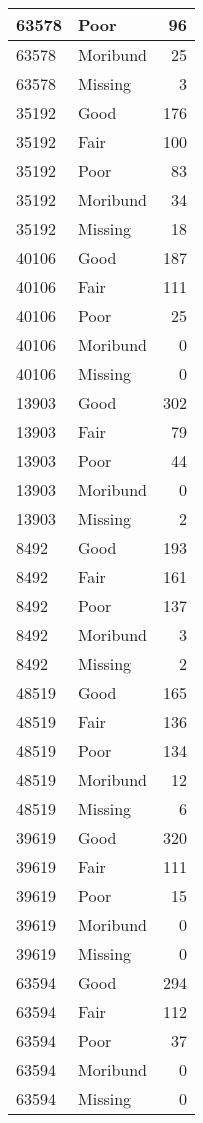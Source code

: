\documentclass[
]{article}
\begin{document}
\begin{tabular}{l|l|r}
\hline
63578 & Poor & 96\\
\hline
63578 & Moribund & 25\\
\hline
63578 & Missing & 3\\
\hline
35192 & Good & 176\\
\hline
35192 & Fair & 100\\
\hline
35192 & Poor & 83\\
\hline
35192 & Moribund & 34\\
\hline
35192 & Missing & 18\\
\hline
40106 & Good & 187\\
\hline
40106 & Fair & 111\\
\hline
40106 & Poor & 25\\
\hline
40106 & Moribund & 0\\
\hline
40106 & Missing & 0\\
\hline
13903 & Good & 302\\
\hline
13903 & Fair & 79\\
\hline
13903 & Poor & 44\\
\hline
13903 & Moribund & 0\\
\hline
13903 & Missing & 2\\
\hline
8492 & Good & 193\\
\hline
8492 & Fair & 161\\
\hline
8492 & Poor & 137\\
\hline
8492 & Moribund & 3\\
\hline
8492 & Missing & 2\\
\hline
48519 & Good & 165\\
\hline
48519 & Fair & 136\\
\hline
48519 & Poor & 134\\
\hline
48519 & Moribund & 12\\
\hline
48519 & Missing & 6\\
\hline
39619 & Good & 320\\
\hline
39619 & Fair & 111\\
\hline
39619 & Poor & 15\\
\hline
39619 & Moribund & 0\\
\hline
39619 & Missing & 0\\
\hline
63594 & Good & 294\\
\hline
63594 & Fair & 112\\
\hline
63594 & Poor & 37\\
\hline
63594 & Moribund & 0\\
\hline
63594 & Missing & 0\\

\end{tabular}
\end{document}
